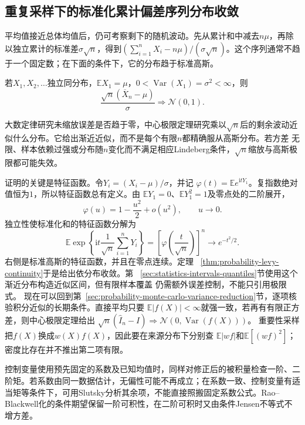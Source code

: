 \subsection{重复采样下的标准化累计偏差序列分布收敛}

平均值接近总体均值后，仍可考察剩下的随机波动。先从累计和中减去\(n\mu\)，再除以独立累计的标准差\(\sigma\sqrt n\)，得到\((\sum_{i=1}^nX_i-n\mu)/(\sigma\sqrt n)\)。这个序列通常不趋于一个固定数；在下面的条件下，它的分布趋于标准高斯。
\label{sec:rv-standardized-sum-limits}
\begin{theorem}
\label{thm:probability-iid-central-limit}
若\(X_1,X_2,\ldots\)独立同分布，\(\mathbb{E}X_1=\mu\)，\(0<\operatorname{Var}(X_1)=\sigma^2<\infty\)，则
\[ \frac{\sqrt{n}(\overline{X}_n-\mu)}{\sigma}
  \Rightarrow\mathcal{N}(0,1). \]
\end{theorem}

大数定律研究未缩放误差是否趋于零，中心极限定理研究乘以\(\sqrt{n}\)后的剩余波动近似什么分布。它给出渐近近似，而不是每个有限\(n\)都精确服从高斯分布。若方差
无限、样本依赖过强或分布随\(n\)变化而不满足相应Lindeberg条件，\(\sqrt{n}\)缩放与高斯极限都可能失效。

证明的关键是特征函数。令\(Y_i=(X_i-\mu)/\sigma\)，并记
\(\varphi(t)=\mathbb{E}e^{\mathrm{i}tY_1}\)。复指数绝对值恒为\(1\)，所以特征函数总有定义。由
\(\mathbb{E}Y_1=0\)、\(\mathbb{E}Y_1^2=1\)及零点处的二阶展开，
\[
  \varphi(u)=1-\frac{u^2}{2}+o(u^2),
  \qquad u\to0.
\]
独立性使标准化和的特征函数分解为
\[
  \mathbb{E}\exp\left\{
    \mathrm{i}t\frac{1}{\sqrt n}\sum_{i=1}^{n}Y_i
  \right\}
  =
  \left[\varphi\left(\frac{t}{\sqrt n}\right)\right]^n
  \longrightarrow e^{-t^2/2}.
\]
右侧是标准高斯的特征函数，并且在零点连续。定理
~\ref{thm:probability-levy-continuity}于是给出依分布收敛。第
~\ref{sec:statistics-intervals-quantiles}节使用这个渐近分布构造近似区间，但有限样本覆盖
仍需额外误差控制，不能只引用极限式。
现在可以回到第~\ref{sec:probability-monte-carlo-variance-reduction}节，逐项核验积分近似的长期条件。直接平均只要
\(\mathbb E|f(X)|<\infty\)就强一致，若再有有限正方差，则中心极限定理给出
\(\sqrt n(\widehat I_n-I)\Rightarrow\mathcal N(0,\operatorname{Var}(f(X)))\)。
重要性采样把\(f(X)\)换成\(w(X)f(X)\)，因此要在来源分布下分别查
\(\mathbb E|wf|\)和\(\mathbb E[(wf)^2]\)；密度比存在并不推出第二项有限。

控制变量使用预先固定的系数及已知均值时，同样对修正后的被积量检查一阶、二阶矩。若系数由同一数据估计，无偏性可能不再成立；在系数一致、控制变量有适当矩等条件下，可用Slutsky分析其余项，不能直接照搬固定系数公式。Rao--Blackwell化的条件期望保留一阶可积性，在二阶可积时又由条件Jensen不等式不增方差。

